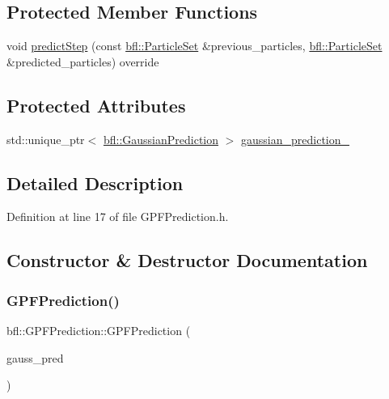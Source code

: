 \subsection*{Protected Member Functions}
\begin{DoxyCompactItemize}
\item 
void \mbox{\hyperlink{classbfl_1_1GPFPrediction_a9eca49102486401afeff748c37438ca3}{predict\+Step}} (const \mbox{\hyperlink{classbfl_1_1ParticleSet}{bfl\+::\+Particle\+Set}} \&previous\+\_\+particles, \mbox{\hyperlink{classbfl_1_1ParticleSet}{bfl\+::\+Particle\+Set}} \&predicted\+\_\+particles) override
\end{DoxyCompactItemize}
\subsection*{Protected Attributes}
\begin{DoxyCompactItemize}
\item 
std\+::unique\+\_\+ptr$<$ \mbox{\hyperlink{classbfl_1_1GaussianPrediction}{bfl\+::\+Gaussian\+Prediction}} $>$ \mbox{\hyperlink{classbfl_1_1GPFPrediction_a2cd16a1045d72c56bbfac5d20d965a03}{gaussian\+\_\+prediction\+\_\+}}
\end{DoxyCompactItemize}


\subsection{Detailed Description}


Definition at line 17 of file G\+P\+F\+Prediction.\+h.



\subsection{Constructor \& Destructor Documentation}
\mbox{\label{classbfl_1_1GPFPrediction_a03ed76dc8f4dd587389b1a3c200c8c6f}} 
\subsubsection{\texorpdfstring{G\+P\+F\+Prediction()}{GPFPrediction()}\hspace{0.1cm}{\footnotesize\ttfamily [1/2]}}
{\footnotesize\ttfamily bfl\+::\+G\+P\+F\+Prediction\+::\+G\+P\+F\+Prediction (\begin{DoxyParamCaption}\item[{std\+::unique\+\_\+ptr$<$ \mbox{\hyperlink{classbfl_1_1GaussianPrediction}{bfl\+::\+Gaussian\+Prediction}} $>$}]{gauss\+\_\+pred }\end{DoxyParamCaption})\hspace{0.3cm}{\ttfamily [noexcept]}}

